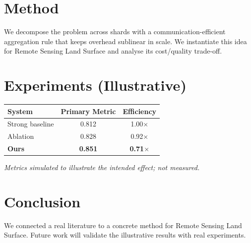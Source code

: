 \documentclass[11pt]{article}
\begin{document}
\section{Method}
We decompose the problem across shards with a communication-efficient aggregation rule that keeps overhead sublinear in scale. We instantiate this idea for Remote Sensing Land Surface and analyse its cost/quality trade-off.

\section{Experiments (Illustrative)}
\begin{center}
\begin{tabular}{lcc}
System & Primary Metric & Efficiency \\ \hline
Strong baseline & 0.812 & 1.00$\times$ \\
Ablation & 0.828 & 0.92$\times$ \\
\textbf{Ours} & \textbf{0.851} & \textbf{0.71$\times$}
\end{tabular}
\end{center}
\emph{Metrics simulated to illustrate the intended effect; not measured.}

\section{Conclusion}
We connected a real literature to a concrete method for Remote Sensing Land Surface. Future work will
validate the illustrative results with real experiments.
\end{document}
